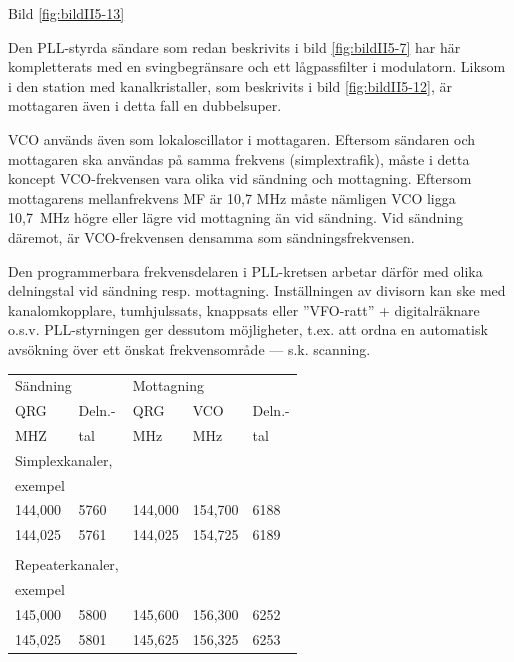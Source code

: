 Bild \ref{fig:bildII5-13}

Den PLL-styrda sändare som redan beskrivits i bild \ref{fig:bildII5-7} har här
kompletterats med en svingbegränsare och ett lågpassfilter i
modulatorn. Liksom i den station med kanalkristaller, som beskrivits i
bild \ref{fig:bildII5-12}, är mottagaren även i detta fall en dubbelsuper.

VCO används även som lokaloscillator i mottagaren. Eftersom sändaren
och mottagaren ska användas på samma frekvens (simplextrafik), måste
i detta koncept VCO-frekvensen vara olika vid sändning och
mottagning. Eftersom mottagarens mellanfrekvens MF är 10,7 MHz måste
nämligen VCO ligga 10,7~MHz högre eller lägre vid mottagning än vid
sändning. Vid sändning däremot, är VCO-frekvensen densamma som
sändningsfrekvensen.

Den programmerbara frekvensdelaren i PLL-kretsen arbetar därför med
olika delningstal vid sändning resp. mottagning. Inställningen av
divisorn kan ske med kanalomkopplare, tumhjulssats, knappsats eller
''VFO-ratt'' + digitalräknare o.s.v. PLL-styrningen ger dessutom
möjligheter, t.ex. att ordna en automatisk avsökning över ett önskat
frekvensområde --- s.k. scanning.

\begin{table}[h]
  \begin{tabular}{ll|lll}
    \multicolumn{2}{l|}{Sändning} &
    \multicolumn{3}{l}{Mottagning} \\
    QRG & Deln.- & QRG & VCO & Deln.- \\
    MHZ & tal    & MHz & MHz & tal \\
    \hline
    \multicolumn{2}{l|}{Simplexkanaler,} & & & \\
    \multicolumn{2}{l|}{exempel} & & & \\
    144,000 & 5760 & 144,000 & 154,700 & 6188 \\
    144,025 & 5761 & 144,025 & 154,725 & 6189 \\
    & & & & \\
    \multicolumn{2}{l|}{Repeaterkanaler,} & & & \\
    \multicolumn{2}{l|}{exempel} & & & \\
    145,000 & 5800 & 145,600 & 156,300 & 6252 \\
    145,025 & 5801 & 145,625 & 156,325 & 6253 \\
  \end{tabular}
\end{table}


